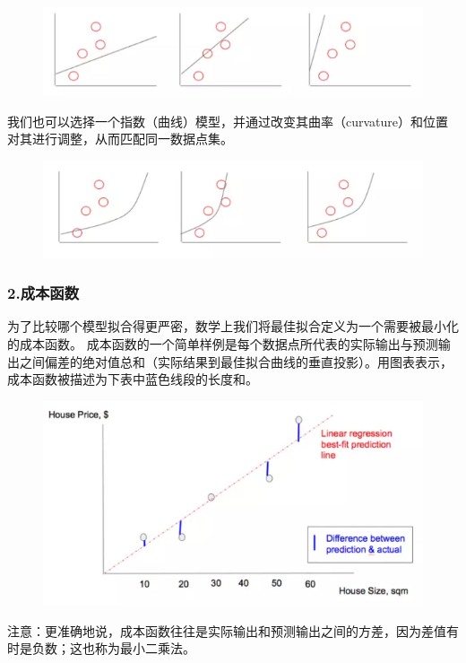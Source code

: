 \documentclass[11pt]{book} %
\begin{document}
\begin{figure}
\centering
\includegraphics[width=0.7\linewidth]{figures/linear_model}
\caption{}
\label{fig:linearmodel}
\end{figure}


我们也可以选择一个指数（曲线）模型，并通过改变其曲率（curvature）和位置对其进行调整，从而匹配同一数据点集。

\begin{figure}
\centering
\includegraphics[width=0.7\linewidth]{figures/curve_model}
\caption{}
\label{fig:linearmodel}
\end{figure}

\subsubsection{2.成本函数}

为了比较哪个模型拟合得更严密，数学上我们将最佳拟合定义为一个需要被最小化的成本函数。 成本函数的一个简单样例是每个数据点所代表的实际输出与预测输出之间偏差的绝对值总和（实际结果到最佳拟合曲线的垂直投影）。用图表表示，成本函数被描述为下表中蓝色线段的长度和。

\begin{figure}
\centering
\includegraphics[width=0.7\linewidth]{figures/cost_function}
\caption{}
\label{fig:costfunction}
\end{figure}


注意：更准确地说，成本函数往往是实际输出和预测输出之间的方差，因为差值有时是负数；这也称为最小二乘法。
\end{document}
